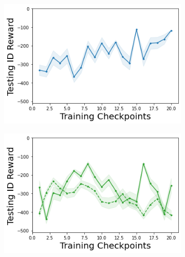 \begin{figure}
\begin{subfigure}{.245\textwidth}
    \end{subfigure}
    \begin{subfigure}{.245\textwidth}
        \includegraphics[width=\textwidth]{sections/011_icml2022/resources/DKL-Acrobot-v1-mean_reward_-testing-strategy.png}
    \end{subfigure}
    \begin{subfigure}{.245\textwidth}
        \includegraphics[width=\textwidth]{sections/011_icml2022/resources/PostNet-Acrobot-v1-mean_reward_-testing-strategy.png}
    \end{subfigure}
    

\end{figure}
